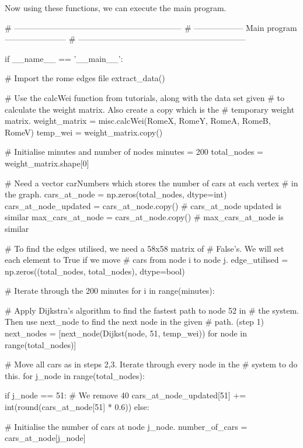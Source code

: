 \documentclass[paper=a4, fontsize=12pt]{scrartcl} %
\numberwithin{equation}{section}       %
\numberwithin{figure}{section}         %
\numberwithin{table}{section}          %
\begin{document}
Now using these functions, we can execute the main program.

\begin{python}
    # --------------------------------------------------------------
    # ------------------    Main program     -----------------------
    # --------------------------------------------------------------


if __name__ == '__main__':

    # Import the rome edges file
    extract_data()

    # Use the calcWei function from tutorials, along with the data set given
    # to calculate the weight matrix. Also create a copy which is the
    # temporary weight matrix.
    weight_matrix = misc.calcWei(RomeX, RomeY, RomeA, RomeB, RomeV)
    temp_wei = weight_matrix.copy()

    # Initialise minutes and number of nodes
    minutes = 200
    total_nodes = weight_matrix.shape[0]

    # Need a vector carNumbers which stores the number of cars at each vertex
    # in the graph.
    cars_at_node = np.zeros(total_nodes, dtype=int)
    cars_at_node_updated = cars_at_node.copy()  # cars_at_node updated is similar
    max_cars_at_node = cars_at_node.copy()  # max_cars_at_node is similar

    # To find the edges utilised, we need a 58x58 matrix of
    # False's. We will set each element to True if we move
    # cars from node i to node j.
    edge_utilised = np.zeros((total_nodes, total_nodes), dtype=bool)

    # Iterate through the 200 minutes
    for i in range(minutes):

        # Apply Dijkstra's algorithm to find the fastest path to node 52 in
        # the system. Then use next_node to find the next node in the given
        # path. (step 1)
        next_nodes = [next_node(Dijkst(node, 51, temp_wei))
                      for node in range(total_nodes)]

        # Move all cars as in steps 2,3. Iterate through every node in the
        # system to do this.
        for j_node in range(total_nodes):

            if j_node == 51:
                # We remove 40%
                cars_at_node_updated[51] += int(round(cars_at_node[51] * 0.6))
            else:

                # Initialise the number of cars at node j_node.
                number_of_cars = cars_at_node[j_node]


\end{python}
\end{document}
